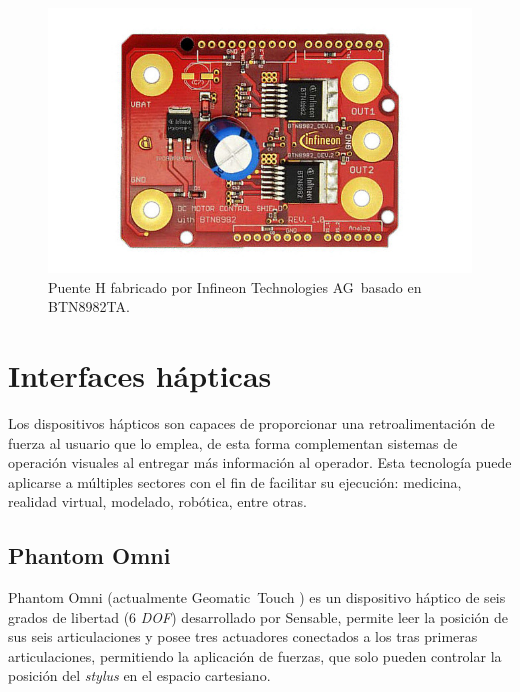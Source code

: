 \begin{figure}[ht]
  \centering
  \includegraphics[scale=.35]{img/cap2/puenteh_infineon}
  \caption{Puente H fabricado por Infineon Technologies AG\textregistered \, basado en BTN8982TA.}
  \label{cap2_punteh_infineon}
\end{figure}

\section{Interfaces hápticas}

Los dispositivos hápticos son capaces de proporcionar una retroalimentación de fuerza al usuario que lo emplea, de esta forma complementan sistemas de operación visuales al entregar más información al operador. Esta tecnología puede aplicarse a múltiples sectores con el fin de facilitar su ejecución: medicina, realidad virtual, modelado, robótica, entre otras.

\subsection{Phantom Omni \texttrademark}

Phantom Omni \texttrademark (actualmente Geomatic\textregistered \, Touch \texttrademark) es un dispositivo háptico de seis grados de libertad (6 \textit{DOF}) desarrollado por Sensable\textregistered, permite leer la posición de sus seis articulaciones y posee tres actuadores conectados a los tras primeras articulaciones, permitiendo la aplicación de fuerzas, que solo pueden controlar la posición del \textit{stylus} en el espacio cartesiano.

